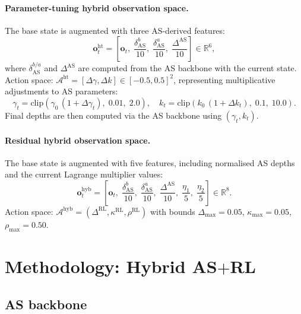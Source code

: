 \documentclass[11pt]{article}
\begin{document}
\paragraph{Parameter-tuning hybrid observation space.}
The base state is augmented with three AS-derived features:
\begin{equation}
  \mathbf{o}^{\text{ht}}_t = \left[\mathbf{o}_t,\;
    \frac{\delta^b_{\text{AS}}}{10},\;
    \frac{\delta^a_{\text{AS}}}{10},\;
    \frac{\Delta^{\text{AS}}}{10}
  \right] \in \mathbb{R}^6,
\end{equation}
where $\delta^{b/a}_{\text{AS}}$ and $\Delta^{\text{AS}}$ are computed
from the AS backbone with the current state.
Action space: $\mathcal{A}^{\text{ht}} = [\Delta\gamma, \Delta k] \in [-0.5, 0.5]^2$,
representing multiplicative adjustments to AS parameters:
\begin{equation}
  \gamma_t = \mathrm{clip}\!\left(\gamma_0\,(1 + \Delta\gamma_t),\; 0.01,\; 2.0\right),
  \quad
  k_t = \mathrm{clip}\!\left(k_0\,(1 + \Delta k_t),\; 0.1,\; 10.0\right).
\end{equation}
Final depths are then computed via the AS backbone using $(\gamma_t, k_t)$.

\paragraph{Residual hybrid observation space.}
The base state is augmented with five features, including normalised
AS depths and the current Lagrange multiplier values:
\begin{equation}
  \mathbf{o}^{\text{hyb}}_t = \left[\mathbf{o}_t,\;
    \frac{\delta^b_{\text{AS}}}{10},\;
    \frac{\delta^a_{\text{AS}}}{10},\;
    \frac{\Delta^{\text{AS}}}{10},\;
    \frac{\eta_1}{5},\;
    \frac{\eta_2}{5}
  \right] \in \mathbb{R}^8.
\end{equation}
Action space: $\mathcal{A}^{\text{hyb}} = (\Delta^{\text{RL}}, \kappa^{\text{RL}}, \rho^{\text{RL}})$
with bounds $\Delta_{\max} = 0.05$, $\kappa_{\max} = 0.05$,
$\rho_{\max} = 0.50$.

\section{Methodology: Hybrid AS$+$RL}
\label{sec:method}

\subsection{AS backbone}
\label{sec:backbone}
\end{document}
